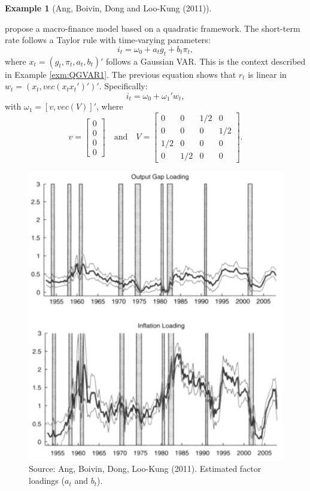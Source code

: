 \documentclass[
  12pt,
]{book}
\theoremstyle{definition}
\theoremstyle{definition}
\newtheorem{example}{Example}[chapter]
\theoremstyle{definition}
\theoremstyle{definition}
\theoremstyle{remark}
\begin{document}
\begin{example}[Ang, Boivin, Dong and Loo-Kung (2011)]
\protect\hypertarget{exm:Angetal2011}{}\label{exm:Angetal2011}

\citet{Ang_Boivin_Dong_LooKung_2011} propose a macro-finance model based on a quadratic framework. The short-term rate follows a Taylor rule with time-varying parameters:
\[
i_t = \omega_0 + a_t g_t + b_t \pi_t,
\]
where \(x_t=(g_t,\pi_t,a_t,b_t)'\) follows a Gaussian VAR. This is the context described in Example \ref{exm:QGVAR1}. The previous equation shows that \(r_t\) is linear in \(w_t = (x_t,vec(x_t x_t')')'\). Specifically:
\[
i_t = \omega_0 + \omega_1'w_t,
\]
with \(\omega_1 = [v,vec(V)]'\), where
\[
v = \left[
\begin{array}{c}
0\\
0\\
0\\
0
\end{array}
\right] \quad \mbox{and} \quad V = \left[
\begin{array}{cccc}
0 & 0& 1/2&0\\
0& 0& 0&1/2\\
1/2& 0& 0&0\\
0&1/2 &0 &0
\end{array}
\right].
\]

\begin{figure}

{\centering \includegraphics[width=0.7\linewidth]{figures/Ang_Boivin_loadings} 

}

\caption{Source: Ang, Boivin, Dong, Loo-Kung (2011). Estimated factor loadings ($a_t$ and $b_t$).}\label{fig:AngBoivin}
\end{figure}

\end{example}
\end{document}
